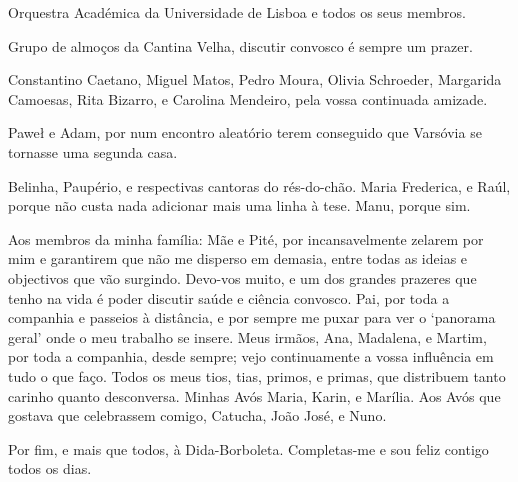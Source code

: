 Orquestra Académica da Universidade de Lisboa e todos os seus membros.

Grupo de almoços da Cantina Velha, discutir convosco é sempre um prazer.

Constantino Caetano, Miguel Matos, Pedro Moura, Olivia Schroeder, Margarida Camoesas, Rita Bizarro, e Carolina Mendeiro, pela vossa continuada amizade.

Pawe\l{} e Adam, por num encontro aleatório terem conseguido que Varsóvia se tornasse uma segunda casa.

Belinha, Paupério, e respectivas cantoras do rés-do-chão.
Maria Frederica, e Raúl, porque não custa nada adicionar mais uma linha à tese.
Manu, porque sim.

\noindent
Aos membros da minha família:
Mãe e Pité, por incansavelmente zelarem por mim e garantirem que não me disperso em demasia, entre todas as ideias e objectivos que vão surgindo. Devo-vos muito, e um dos grandes prazeres que tenho na vida é poder discutir saúde e ciência convosco.
Pai, por toda a companhia e passeios à distância, e por sempre me puxar para ver o `panorama geral' onde o meu trabalho se insere.
Meus irmãos, Ana, Madalena, e Martim, por toda a companhia, desde sempre; vejo continuamente a vossa influência em tudo o que faço.
Todos os meus tios, tias, primos, e primas, que distribuem tanto carinho quanto desconversa.
Minhas Avós Maria, Karin, e Marília.
Aos Avós que gostava que celebrassem comigo, Catucha, João José, e Nuno.

\bsni
Por fim, e mais que todos, à Dida-Borboleta.
Completas-me e sou feliz contigo todos os dias.


\vfill
